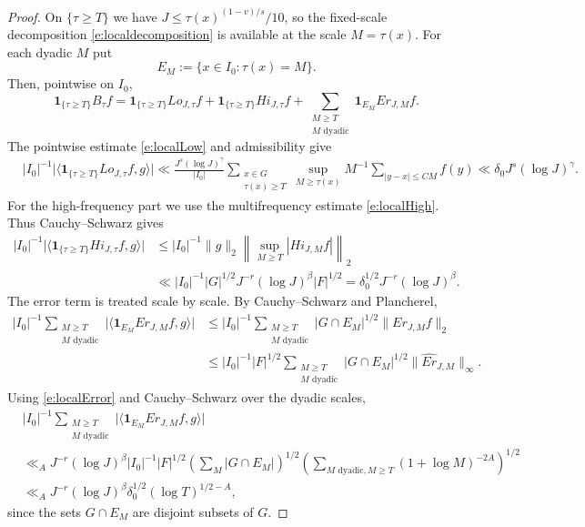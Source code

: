 \documentclass[12pt,reqno]{amsart}
\numberwithin{equation}{section}
\theoremstyle{definition}
\theoremstyle{remark}
\begin{document}
\begin{proof}
On $\{\tau\geq T\}$ we have
$J\leq\tau(x)^{(1-v)/s}/10$, so the fixed-scale decomposition
\eqref{e:localdecomposition} is available at the scale $M=\tau(x)$.
For each dyadic $M$ put
\[
 E_M:=\{x\in I_0:\tau(x)=M\}.
\]
Then, pointwise on $I_0$,
\[
 \mathbf1_{\{\tau\geq T\}}B_\tau f
 =
 \mathbf1_{\{\tau\geq T\}}Lo_{J,\tau}f
 +
 \mathbf1_{\{\tau\geq T\}}Hi_{J,\tau}f
 +
 \sum_{\substack{M\geq T\\M\text{ dyadic}}}
 \mathbf1_{E_M}Er_{J,M}f.
\]
The pointwise estimate \eqref{e:localLow} and admissibility give 
\begin{align*}
 &|I_0|^{-1}
 \big|\langle\mathbf1_{\{\tau\geq T\}}
 Lo_{J,\tau}f,g\rangle\big|\ll
 \frac{J^s(\log J)^\gamma}{|I_0|}
 \sum_{\substack{x\in G\\\tau(x)\geq T}}
 \sup_{M\geq\tau(x)}M^{-1}
 \sum_{|y-x|\leq CM}f(y)\ll
 \delta_0J^s(\log J)^\gamma.
\end{align*}
For the high-frequency part we  use the multifrequency estimate \eqref{e:localHigh}.
Thus Cauchy--Schwarz gives
\begin{align*}
 |I_0|^{-1}
 \big|\langle\mathbf1_{\{\tau\geq T\}}Hi_{J,\tau}f,g\rangle\big|
 &\leq |I_0|^{-1}\|g\|_2
 \left\|\sup_{M\geq T}|Hi_{J,M}f|\right\|_2  \\
 &\ll
 |I_0|^{-1}|G|^{1/2}J^{-r}(\log J)^\beta |F|^{1/2}  =\delta_0^{1/2}J^{-r}(\log J)^\beta .
\end{align*}
The error term is treated scale by scale.  By Cauchy--Schwarz and
Plancherel,
\begin{align*}
 |I_0|^{-1}
 \sum_{\substack{M\geq T\\ M\text{ dyadic}}}
 \big|\langle\mathbf1_{E_M}Er_{J,M}f,g\rangle\big| & \leq
 |I_0|^{-1}
 \sum_{\substack{M\geq T\\ M\text{ dyadic}}}
 |G\cap E_M|^{1/2}\|Er_{J,M}f\|_2 \\
 &\leq
 |I_0|^{-1}|F|^{1/2}
 \sum_{\substack{M\geq T\\ M\text{ dyadic}}}
 |G\cap E_M|^{1/2}\|\widehat{Er}_{J,M}\|_\infty .
\end{align*}
Using \eqref{e:localError} and Cauchy--Schwarz over the dyadic scales,
\begin{align*}
  &|I_0|^{-1}
 \sum_{\substack{M\geq T\\ M\text{ dyadic}}}
 \big|\langle\mathbf1_{E_M}Er_{J,M}f,g\rangle\big| \\
 &\ll_A
 J^{-r}(\log J)^{\beta}|I_0|^{-1}|F|^{1/2}
 \left(\sum_M |G\cap E_M|\right)^{1/2}
 \left(\sum_{M\text{ dyadic},M\geq T}(1+\log M)^{-2A}\right)^{1/2}\\
 &\ll_A J^{-r}(\log J)^{\beta}
 \delta_0^{1/2} (\log T)^{1/2-A},
\end{align*}
since the sets $G\cap E_M$ are disjoint subsets of $G$.


\end{proof}
\end{document}
